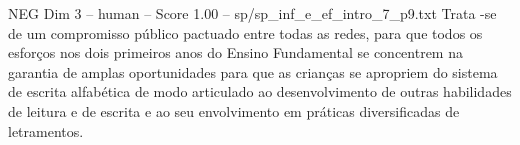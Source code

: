 \begin{textsample}{NEG Dim 3 – human – Score 1.00 – sp/sp\_inf\_e\_ef\_intro\_7\_p9.txt}  \label{ex:f3_neg_009}
Trata -se de um compromisso público pactuado entre todas as redes, para que todos os esforços nos dois primeiros anos do Ensino Fundamental se concentrem na garantia de amplas oportunidades para que as crianças se apropriem do sistema de escrita alfabética de modo articulado ao desenvolvimento de outras habilidades de leitura e de escrita e ao seu envolvimento em práticas diversificadas de letramentos.

\end{textsample}
